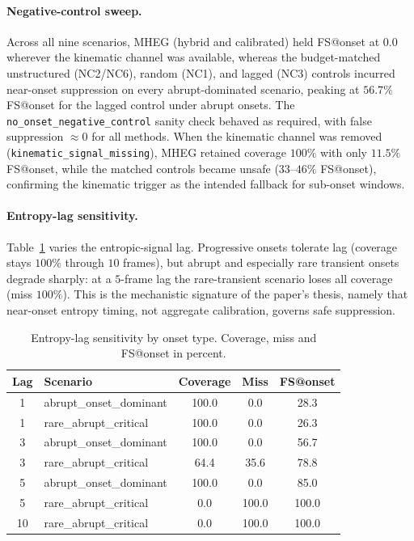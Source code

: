\paragraph{Negative-control sweep.}
Across all nine scenarios, \mbox{MHEG} (hybrid and calibrated) held FS@onset at
$0.0$ wherever the kinematic channel was available, whereas the budget-matched
unstructured (NC2/NC6), random (NC1), and lagged (NC3) controls incurred
near-onset suppression on every abrupt-dominated scenario, peaking at
$56.7\%$ FS@onset for the lagged control under abrupt onsets. The
\texttt{no\_onset\_negative\_control} sanity check behaved as required, with
false suppression $\approx 0$ for all methods. When the kinematic channel was
removed (\texttt{kinematic\_signal\_missing}), \mbox{MHEG} retained coverage
$100\%$ with only $11.5\%$ FS@onset, while the matched controls became unsafe
($33$--$46\%$ FS@onset), confirming the kinematic trigger as the intended
fallback for sub-onset windows.

\paragraph{Entropy-lag sensitivity.}
Table~\ref{tab:rob_lag} varies the entropic-signal lag. Progressive onsets
tolerate lag (coverage stays $100\%$ through $10$ frames), but abrupt and
especially rare transient onsets degrade sharply: at a $5$-frame lag the
rare-transient scenario loses all coverage (miss $100\%$). This is the
mechanistic signature of the paper's thesis, namely that near-onset entropy
timing, not aggregate calibration, governs safe suppression.

\begin{table}[!tbp]
\centering
\caption{Entropy-lag sensitivity by onset type. Coverage, miss and FS@onset
in percent.}
\label{tab:rob_lag}
\scriptsize
\setlength{\tabcolsep}{4pt}
\renewcommand{\arraystretch}{1.18}
\begin{tabular}{c l c c c}
\toprule
\textbf{Lag} & \textbf{Scenario} & \textbf{Coverage} & \textbf{Miss} & \textbf{FS@onset} \\
\midrule
1  & abrupt\_onset\_dominant & 100.0 & 0.0   & 28.3 \\
\rowcolor{gray!8}
1  & rare\_abrupt\_critical  & 100.0 & 0.0   & 26.3 \\
3  & abrupt\_onset\_dominant & 100.0 & 0.0   & 56.7 \\
\rowcolor{gray!8}
3  & rare\_abrupt\_critical  & 64.4  & 35.6  & 78.8 \\
5  & abrupt\_onset\_dominant & 100.0 & 0.0   & 85.0 \\
\rowcolor{gray!8}
5  & rare\_abrupt\_critical  & 0.0   & 100.0 & 100.0 \\
10 & rare\_abrupt\_critical  & 0.0   & 100.0 & 100.0 \\
\bottomrule
\end{tabular}
\end{table}

